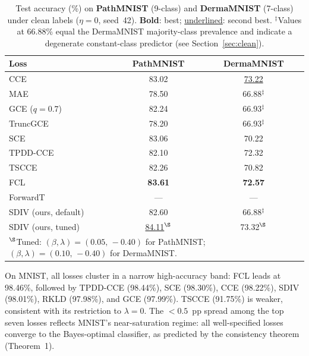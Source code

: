 \begin{table}[t]
\centering
\caption{Test accuracy (\%) on \textbf{PathMNIST} (9-class) and
\textbf{DermaMNIST} (7-class) under clean labels ($\eta{=}0$, seed~42).
\textbf{Bold}: best; \underline{underlined}: second best.
$^{\ddagger}$Values at 66.88\% equal the DermaMNIST majority-class prevalence
and indicate a degenerate constant-class predictor (see Section~\ref{sec:clean}).}
\label{tab:clean_medical}
\small
\begin{tabular}{@{}lcc@{}}
\toprule
\textbf{Loss} & \textbf{PathMNIST} & \textbf{DermaMNIST} \\
\midrule
CCE                  & 83.02                      & \underline{73.22}     \\
MAE                  & 78.50                      & 66.88$^{\ddagger}$    \\
GCE ($q{=}0.7$)      & 82.24                      & 66.93$^{\ddagger}$    \\
TruncGCE             & 78.20                      & 66.93$^{\ddagger}$    \\
SCE                  & 83.06                      & 70.22                 \\
TPDD-CCE             & 82.10                      & 72.32                 \\
TSCCE                & 82.26                      & 70.82                 \\
FCL                  & \textbf{83.61}             & \textbf{72.57}        \\
ForwardT             & ---                        & ---                   \\
SDIV (ours, default) & 82.60                      & 66.88$^{\ddagger}$    \\
SDIV (ours, tuned)   & \underline{84.11}$^{\S}$   & 73.32$^{\S}$          \\
\midrule
\multicolumn{3}{l}{\footnotesize
  $^{\S}$Tuned: $(\beta,\lambda){=}(0.05,\,-0.40)$ for PathMNIST;
  $(\beta,\lambda){=}(0.10,\,-0.40)$ for DermaMNIST.}\\
\bottomrule
\end{tabular}
\end{table}

On MNIST, all losses cluster in a narrow high-accuracy band:
FCL leads at 98.46\%, followed by TPDD-CCE (98.44\%), SCE (98.30\%),
CCE (98.22\%), SDIV (98.01\%), RKLD (97.98\%), and GCE (97.99\%).
TSCCE (91.75\%) is weaker, consistent with its restriction to $\lambda{=}0$.
The $<0.5$~pp spread among the top seven losses reflects MNIST's
near-saturation regime: all well-specified losses converge to the
Bayes-optimal classifier, as predicted by the consistency theorem (Theorem~1).

